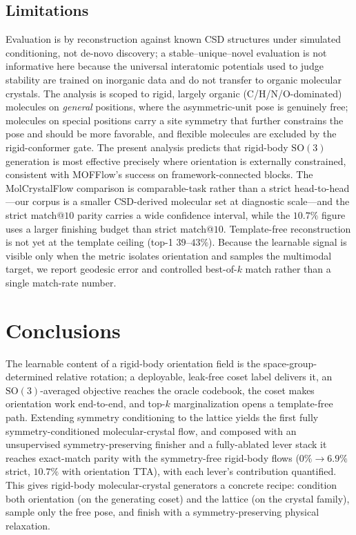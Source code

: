 \documentclass[journal=acsodf,manuscript=article]{achemso}
\begin{document}
\subsection{Limitations}\label{sec:limits}
Evaluation is by reconstruction against known CSD structures under simulated
conditioning, not de-novo discovery; a stable--unique--novel evaluation is not
informative here because the universal interatomic potentials used to judge
stability are trained on inorganic data\cite{deng2023chgnet} and do not transfer to
organic molecular crystals. The analysis is scoped to rigid, largely organic
(C/H/N/O-dominated) molecules on \emph{general} positions, where the
asymmetric-unit pose is genuinely free; molecules on special positions carry a site
symmetry that further constrains the pose and should be more favorable, and
flexible molecules are excluded by the rigid-conformer gate. The present analysis
predicts that rigid-body $\mathrm{SO}(3)$ generation is most effective precisely
where orientation is externally constrained, consistent with MOFFlow's success on
framework-connected blocks\cite{kim2025mofflow}. The MolCrystalFlow comparison is
comparable-task rather than a strict head-to-head---our corpus is a smaller
CSD-derived molecular set at diagnostic scale---and the strict match@$10$ parity
carries a wide confidence interval, while the $10.7\%$ figure uses a larger
finishing budget than strict match@$10$. Template-free reconstruction is not yet at
the template ceiling (top-1 $39$--$43\%$). Because the learnable signal is visible
only when the metric isolates orientation and samples the multimodal target, we
report geodesic error and controlled best-of-$k$ match rather than a single
match-rate number\cite{martirossyan2025matching}.

\section{Conclusions}
The learnable content of a rigid-body orientation field is the
space-group-determined relative rotation; a deployable, leak-free coset label
delivers it, an $\mathrm{SO}(3)$-averaged objective reaches the oracle codebook, the
coset makes orientation work end-to-end, and top-$k$ marginalization opens a
template-free path. Extending symmetry conditioning to the lattice yields the first
fully symmetry-conditioned molecular-crystal flow, and composed with an
unsupervised symmetry-preserving finisher and a fully-ablated lever stack it reaches
exact-match parity with the symmetry-free rigid-body flows ($0\%\!\to\!6.9\%$
strict, $10.7\%$ with orientation TTA), with each lever's contribution quantified. This gives rigid-body molecular-crystal
generators\cite{zeng2026molcrystalflow} a concrete recipe: condition both
orientation (on the generating coset) and the lattice (on the crystal family),
sample only the free pose, and finish with a symmetry-preserving physical
relaxation.
\end{document}
